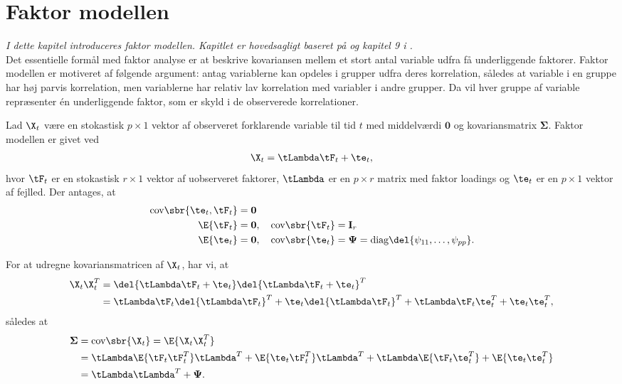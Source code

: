 \chapter{Faktor modellen}
\textit{I dette kapitel introduceres faktor modellen. Kapitlet er hovedsagligt baseret på \citep{stock_watson_2002a} og kapitel 9 i \citep{faktorbook}.} \\[2mm]
%
Det essentielle formål med faktor analyse er at beskrive kovariansen mellem et stort antal variable udfra få underliggende faktorer.
Faktor modellen er motiveret af følgende argument: antag variablerne kan opdeles i grupper udfra deres korrelation, således at variable i en gruppe har høj parvis korrelation, men variablerne har relativ lav korrelation med variabler i andre grupper.
Da vil hver gruppe af variable repræsenter én underliggende faktor, som er skyld i de observerede korrelationer.
%
\begin{defn}
Lad \(\X_t\) være en stokastisk \(p \times 1\) vektor af observeret forklarende variable til tid \(t\) med middelværdi \(\mathbf{0}\) og kovariansmatrix \(\boldsymbol{\Sigma}\).
Faktor modellen er givet ved
\begin{align}
\X_t = \tLambda \tF_t + \te_t, \label{eq:factor_model}
\end{align}
hvor \(\tF_t\) er en stokastisk \(r \times 1\) vektor af uobserveret faktorer, \(\tLambda\) er en \(p \times r\) matrix med faktor loadings og \(\te_t\) er en \(p \times 1\) vektor af fejlled.
Der antages, at
\begin{align*}
\text{cov} \sbr{\te_t, \tF_t} &= \mathbf{0} \\
\E{\tF_t} &= \mathbf{0}, \quad \text{cov}\sbr{\tF_t} = \mathbf{I}_r \\
\E{\te_t} &= \mathbf{0}, \quad \text{cov}\sbr{\te_t} = \boldsymbol{\Psi} = \text{diag} \del{\psi_{11}, \ldots, \psi_{pp}}.
\end{align*}
\end{defn}
%
For at udregne kovariansmatricen af \(\X_t\), har vi, at
\begin{align*}
\X_t \X_t^T &= \del{ \tLambda \tF_t + \te_t} \del{ \tLambda \tF_t + \te_t}^T \\
&= \tLambda \tF_t \del{\tLambda \tF_t }^T + \te_t \del{\tLambda \tF_t}^T + \tLambda \tF_t \te_t^T + \te_t \te_t^T,
\end{align*}
således at
\begin{align*}
\boldsymbol{\Sigma} &= \text{cov} \sbr{\X_t} = \E{\X_t \X_t^T} \\
&= \tLambda \E{\tF_t \tF_t^T} \tLambda^T + \E{\te_t \tF_t^T} \tLambda^T + \tLambda \E{\tF_t \te_t^T} + \E{\te_t \te_t^T} \\
&= \tLambda \tLambda^T + \boldsymbol{\Psi}.
\end{align*}
